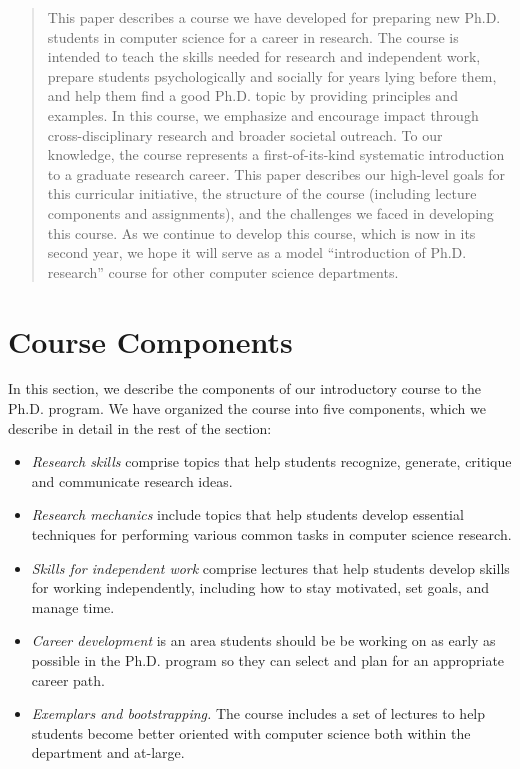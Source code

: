 \begin{abstract}
This paper describes a course we have developed for preparing new Ph.D.
students in computer science for a career in research.  The course is
intended to teach the skills needed for research and independent work,
prepare students psychologically and socially for years lying before
them, and help them find a good Ph.D. topic by providing principles and
examples.  In this course, we emphasize and encourage impact through
cross-disciplinary research and broader societal outreach.  To our
knowledge, the course represents a first-of-its-kind systematic
introduction to a graduate research career.  This paper describes our
high-level goals for this curricular initiative, the structure of the
course (including lecture components and assignments), and the
challenges we faced in developing this course.  As we continue to
develop this course, which is now in its second year, we hope it will
serve as a model ``introduction of Ph.D. research'' course for other
computer science departments.
\end{abstract}
\section{Course Components}\label{sec:components}

In this section, we describe the components of our introductory course
to the Ph.D. program.  We have organized the course into five
components, which we describe in detail in the rest of the section:

\begin{itemize}
\itemsep=-1pt
\item {\em Research skills} comprise topics that help students
  recognize, generate, critique and communicate research ideas.
\item {\em Research mechanics} include topics that help students develop
  essential techniques for performing various common tasks in computer
  science research.
\item {\em Skills for independent work} comprise lectures that help
  students develop skills for working independently, including how to stay
  motivated, set goals, and manage time.
\item {\em Career development} is an area students should be be working
  on as early as possible in the Ph.D. program so they can select and
  plan for an appropriate career path.
\item {\em Exemplars and bootstrapping.} The course includes a set of
  lectures to help students become better oriented with computer science
  both within the department and at-large.
\end{itemize}

